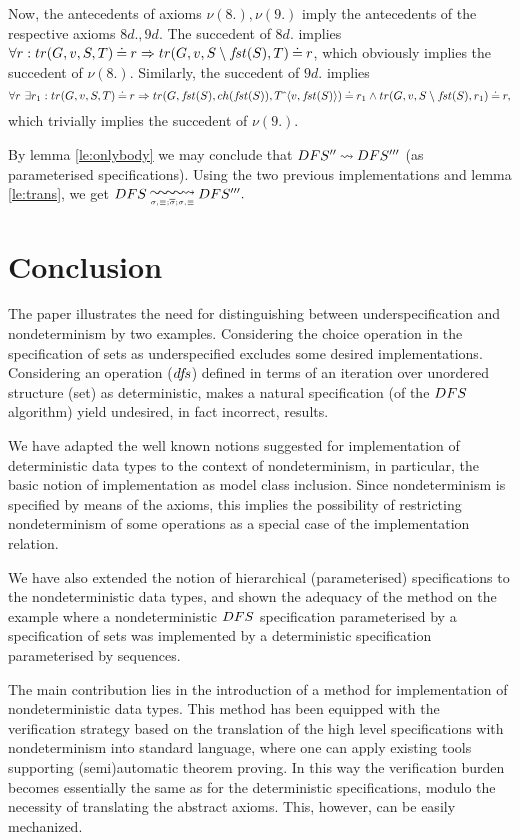 Now, the antecedents of axioms $\nu(8.),\nu(9.)$ imply the antecedents of the respective axioms $8d.,9d.$
The succedent of $8d.$ implies $\forall r: tr(G,v,S,T)\mathbin{\doteq} r\mathrel\Rightarrow tr(G,v,S\setminus f\!st(S),T)\mathbin{\doteq} r$, which obviously implies the succedent of $\nu(8.).$ Similarly, the succedent of $9d.$ implies $$\forall r\ \exists r_1: tr(G,v,S,T)\mathbin{\doteq} r\mathrel\Rightarrow tr(G,f\!st(S),ch(f\!st(S)),T\hat{\ }\langle v,f\!st(S)\rangle) \mathbin{\doteq} r_1\land tr(G,v,S\setminus f\!st(S),r_1)\mathbin{\doteq} r,$$ which trivially implies the succedent of $\nu(9.).$

By lemma \ref{le:onlybody} we may conclude that $DFS''\mathbin{\leadsto} DFS'''$ (as parameterised specifications). Using the two previous implementations and lemma \ref{le:trans}, we get $\DFS\impd{}{\sigma,\equiv;\overline\sigma;\sigma,\equiv}\DFS'''.$ 

\section{Conclusion}\label{se:conclusion} The paper illustrates the need for distinguishing between underspecification and nondeterminism by two examples. Considering the choice operation in the specification of sets as underspecified excludes some desired implementations.
Considering an operation ($df\!s$) defined in terms of an iteration over unordered structure (set) as deterministic, makes a natural specification (of the $DFS$ algorithm) yield undesired, in fact incorrect, results. 

We have adapted the well known notions suggested for implementation of deterministic
data types to the context of nondeterminism, in particular, the basic notion of implementation as model class inclusion. Since nondeterminism is specified by means of the axioms, this implies the possibility of restricting nondeterminism of some operations as a special case of the implementation relation.

We have also extended the notion of hierarchical (parameterised) specifications to the nondeterministic data types, and shown the adequacy of the method on the example where a nondeterministic $DFS$ specification parameterised by a specification of sets was implemented by a deterministic specification parameterised by sequences. 

The main contribution lies in the introduction of a method for implementation of nondeterministic data types. This method has been equipped with the verification strategy based on the translation of the high level specifications
with nondeterminism into standard language, where one can apply existing tools
supporting (semi)automatic theorem proving. In this way the verification burden becomes essentially the same as for the deterministic specifications, modulo the necessity of translating the abstract
axioms. This, however, can be easily mechanized. 

